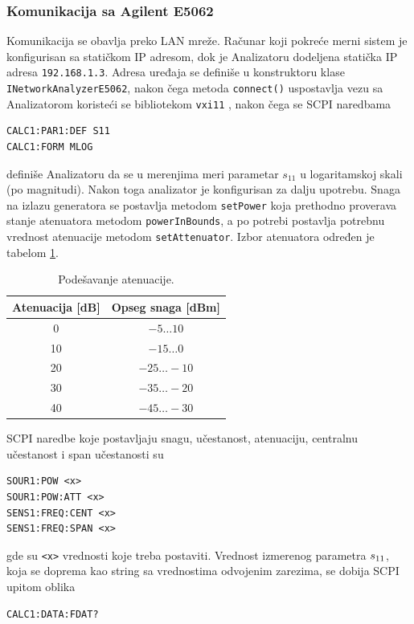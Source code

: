 \documentclass[a4paper, 12pt, diplomski]{etf}
\begin{document}
\subsubsection{Komunikacija sa Agilent E5062}
Komunikacija se obavlja preko LAN mreže. Računar koji pokreće merni 
sistem je konfigurisan sa statičkom IP adresom, dok je Analizatoru 
dodeljena statička IP adresa \verb|192.168.1.3|. Adresa uređaja se 
definiše u konstruktoru klase \verb|INetworkAnalyzerE5062|, 
nakon čega metoda \verb|connect()| uspostavlja vezu sa Analizatorom
koristeći se bibliotekom \verb|vxi11| \cite{vxi11}, nakon čega
se SCPI naredbama\cite{progman}
\begin{lstlisting}
CALC1:PAR1:DEF S11
CALC1:FORM MLOG
\end{lstlisting}
definiše Analizatoru da se u merenjima meri parametar $s_{11}$
u logaritamskoj skali (po magnitudi). Nakon toga analizator je
konfigurisan za dalju upotrebu. Snaga na izlazu generatora 
se postavlja metodom \verb|setPower| koja prethodno proverava 
stanje atenuatora metodom \verb|powerInBounds|, a po potrebi postavlja potrebnu vrednost atenuacije metodom \verb|setAttenuator|. Izbor
atenuatora određen je tabelom \ref{tab:att}.
\begin{table}[ht!]
    \centering
    \begin{tabular}{|c|c|} \hline
         Atenuacija [dB] & Opseg snaga [dBm]  \\ \hline \hline
         0 & $-5 \ldots 10$ \\
         10 & $-15 \ldots 0$ \\
         20 & $-25 \ldots -10$ \\
         30 & $-35 \ldots -20$ \\
         40 & $-45 \ldots -30$ \\ \hline
    \end{tabular}
    \caption{Podešavanje atenuacije.}
    \label{tab:att}
\end{table}

SCPI naredbe koje postavljaju snagu, učestanost, atenuaciju, 
centralnu učestanost i span učestanosti su
\begin{lstlisting}
SOUR1:POW <x>
SOUR1:POW:ATT <x>
SENS1:FREQ:CENT <x>
SENS1:FREQ:SPAN <x>
\end{lstlisting}
gde su \verb|<x>| vrednosti koje treba postaviti. Vrednost 
izmerenog parametra $s_{\rm 11}$, koja se doprema kao string sa 
vrednostima odvojenim zarezima, se dobija SCPI upitom oblika
\begin{lstlisting}
CALC1:DATA:FDAT?
\end{lstlisting}
\end{document}
